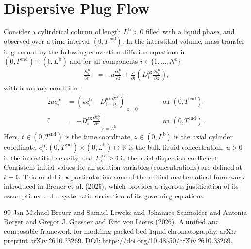 \documentclass{article}
\begin{document}
\section*{Dispersive Plug Flow}
Consider a cylindrical column of length $L^{\mathrm{b}} > 0$ filled with a liquid phase, and observed over a time interval $(0, T^{\mathrm{end}})$.
In the interstitial volume, mass transfer is governed by the following convection-diffusion equations in $(0, T^{\mathrm{end}})\times (0, L^{\mathrm{b}})$ and for all components $i\in\{1, \dots, N^{\mathrm{c}} \}$
\begin{align}
    \frac{\partial c^{\mathrm{b}}_{i}}{\partial t}
    &= - u \frac{\partial c^{\mathrm{b}}_{i}}{\partial z}
        + \frac{\partial}{\partial z} \left( D^{\mathrm{ax}}_{i} \frac{\partial c^{\mathrm{b}}_{i}}{\partial z} \right),
\end{align}
with boundary conditions
\begin{alignat}{2}
    u c^{\mathrm{in}}_{i}
    &= \left.\left( u c^{\mathrm{b}}_{i} - D^{\mathrm{ax}}_{i} \frac{\partial c^{\mathrm{b}}_{i}}{\partial z}\right)\right|_{z=0}
    & & \qquad\text{on }(0, T^{\mathrm{end}}),
    \\
    0
    &= - D^{\mathrm{ax}}_{i} \left. \frac{\partial c^{\mathrm{b}}_{i}}{\partial z} \right|_{z=L^{\mathrm{b}}}
    & & \qquad\text{on }(0, T^{\mathrm{end}}).
\end{alignat}
Here, $t\in (0, T^{\mathrm{end}})$ is the time coordinate, $z\in (0, L^{\mathrm{b}})$ is the axial cylinder coordinate, $c^{\mathrm{b}}_{i}\colon (0, T^{\mathrm{end}})\times (0, L^{\mathrm{b}}) \mapsto \mathbb{R}$ is the bulk liquid concentration, $u> 0$ is the interstitial velocity, and $D^{\mathrm{ax}}_{i}\geq 0$ is the axial dispersion coefficient.
Consistent initial values for all solution variables (concentrations) are defined at $t = 0$.
This model is a particular instance of the unified mathematical framework introduced in Breuer et al. (2026), which provides a rigorous justification of its assumptions and a systematic derivation of its governing equations.
\begin{thebibliography}{99}
     Jan Michael Breuer and Samuel Leweke and Johannes Schmölder and Antonia Berger and Gregor J. Gassner and Eric von Lieres (2026). A unified and composable framework for modeling packed-bed liquid chromatography. arXiv preprint arXiv:2610.33269. DOI: https://doi.org/10.48550/arXiv.2610.33269.
\end{thebibliography}
\end{document}
